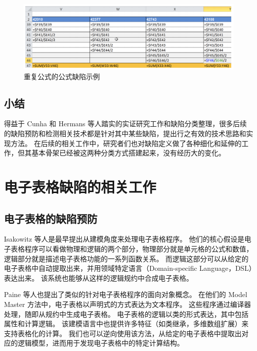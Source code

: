 \begin{figure}[tbp]    
    \centering
    \includegraphics[width=\textwidth]{figure/relatedwork/DuplicatedFormula.png}
    \caption{重复公式的公式缺陷示例}
    \label{figure-DuplicatedFormula}
\end{figure}

\subsection{小结}
得益于 Cunha 和 Hermans 等人踏实的实证研究工作和缺陷分类整理，很多后续的缺陷预防和检测相关技术都是针对其中某些缺陷，提出行之有效的技术思路和实现方法。
在后续的相关工作中，研究者们也对缺陷定义做了各种细化和延伸的工作，但其基本骨架已经被这两种分类方式搭建起来，没有经历大的变化。


\section{电子表格缺陷的相关工作}


\subsection{电子表格的缺陷预防}
Isakowitz 等人\cite{isakowitz1995toward}是最早提出从建模角度来处理电子表格程序。
他们的核心假设是电子表格程序可以看做物理和逻辑的两个部分，物理部分就是单元格的公式和数值，逻辑部分就是描述电子表格功能的一系列函数关系。
而逻辑这部分可以从给定的电子表格中自动提取出来，并用领域特定语言（Domain-specific Language，DSL）表达出来。
该系统也能够从这样的逻辑规约中合成电子表格。

Paine 等人\cite{ireson1997model,paine2008ensuring}也提出了类似的针对电子表格程序的面向对象概念。
在他们的 Model Master 方法中，电子表格以声明式的方式表达为文本程序。
这些程序通过编译器处理，随即从规约中生成电子表格。
电子表格的逻辑以类的形式表达，其中包括属性和计算逻辑。
该建模语言中也提供许多特征（如类继承，多维数组扩展）来支持表格化的计算。
我们也可以逆向使用该方法，从给定的电子表格中提取出对应的逻辑模型，进而用于发现电子表格中的特定计算结构\cite{paine2008spreadsheet}。

